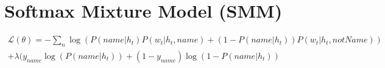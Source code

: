 \section{Softmax Mixture Model (SMM)}
\label{sec:mixtureModel}

\begin{equation}
	\begin{gathered}
		\mathcal{L}(\theta) = -\sum_{n} \log(P(name|h_t)P(w_t|h_t, name) + (1-P(name|h_t))P(w_t|h_t, notName)) \\
		+ \lambda(y_{name}\log(P(name|h_t)) + (1 - y_{name})\log(1-P(name|h_t)) \\
	\end{gathered}
\end{equation}

